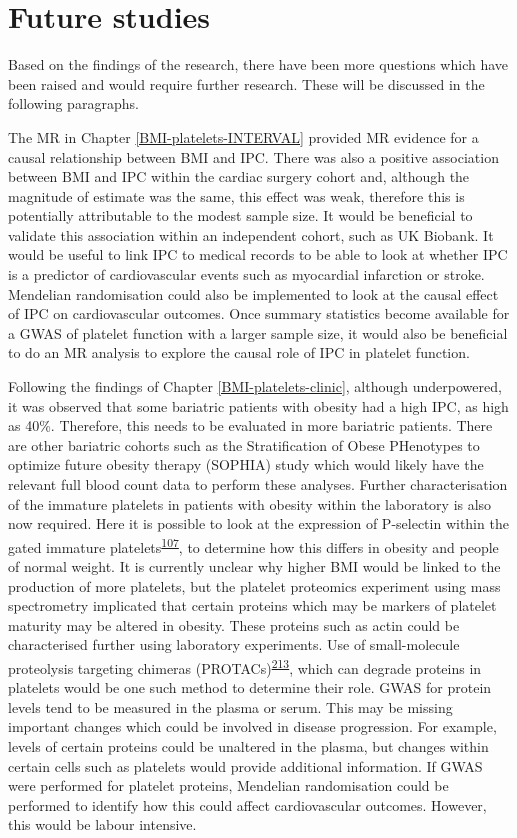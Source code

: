 \documentclass[11pt,twoside]{bristolthesis}
\begin{document}
\hypertarget{future-studies}{%
\section{Future studies}\label{future-studies}}

Based on the findings of the research, there have been more questions which have been raised and would require further research. These will be discussed in the following paragraphs.

The MR in Chapter \ref{BMI-platelets-INTERVAL} provided MR evidence for a causal relationship between BMI and IPC. There was also a positive association between BMI and IPC within the cardiac surgery cohort and, although the magnitude of estimate was the same, this effect was weak, therefore this is potentially attributable to the modest sample size. It would be beneficial to validate this association within an independent cohort, such as UK Biobank. It would be useful to link IPC to medical records to be able to look at whether IPC is a predictor of cardiovascular events such as myocardial infarction or stroke. Mendelian randomisation could also be implemented to look at the causal effect of IPC on cardiovascular outcomes. Once summary statistics become available for a GWAS of platelet function with a larger sample size, it would also be beneficial to do an MR analysis to explore the causal role of IPC in platelet function.

Following the findings of Chapter \ref{BMI-platelets-clinic}, although underpowered, it was observed that some bariatric patients with obesity had a high IPC, as high as 40\%. Therefore, this needs to be evaluated in more bariatric patients. There are other bariatric cohorts such as the Stratification of Obese PHenotypes to optimize future obesity therapy (SOPHIA) study which would likely have the relevant full blood count data to perform these analyses. Further characterisation of the immature platelets in patients with obesity within the laboratory is also now required. Here it is possible to look at the expression of P-selectin within the gated immature platelets\textsuperscript{\protect\hyperlink{ref-Bernlochner2015a}{107}}, to determine how this differs in obesity and people of normal weight. It is currently unclear why higher BMI would be linked to the production of more platelets, but the platelet proteomics experiment using mass spectrometry implicated that certain proteins which may be markers of platelet maturity may be altered in obesity. These proteins such as actin could be characterised further using laboratory experiments. Use of small-molecule proteolysis targeting chimeras (PROTACs)\textsuperscript{\protect\hyperlink{ref-Sledz2020}{213}}, which can degrade proteins in platelets would be one such method to determine their role. GWAS for protein levels tend to be measured in the plasma or serum. This may be missing important changes which could be involved in disease progression. For example, levels of certain proteins could be unaltered in the plasma, but changes within certain cells such as platelets would provide additional information. If GWAS were performed for platelet proteins, Mendelian randomisation could be performed to identify how this could affect cardiovascular outcomes. However, this would be labour intensive.
\end{document}

